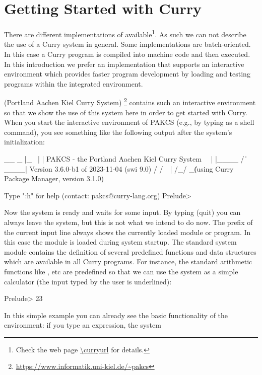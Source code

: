 \chapter{Getting Started with Curry}

There are different implementations of \curryref{}
available\footnote{Check the web page \url{\curryurl} for details.}.
As such we can not describe the use of a Curry system
in general. Some implementations are batch-oriented.  In this case a 
Curry program is compiled into machine code and then executed. 
In this introduction we prefer an implementation that supports an interactive environment which provides faster program development by loading and testing programs within the integrated environment.

\pakcs{} (Portland Aachen Kiel Curry System)
\cite{AntoyHanus00FROCOS,Hanus23PAKCS}\footnote{\url{https://www.informatik.uni-kiel.de/~pakcs}}
contains such an interactive environment so that we show the use
of this system here in order to get started with Curry.
When you start the interactive environment of PAKCS
(e.g., by typing 
as a shell command),
you see something like the following output after the system's
initialization:
%
\begin{curry}
 __    _
|_ \  | |            PAKCS - the Portland Aachen Kiel Curry System
  \ \ | |____
  /  \|  ____|       Version 3.6.0-b1 of 2023-11-04 (swi 9.0)
 / /\ \ |
/_/  \_\|            (using Curry Package Manager, version 3.1.0)

Type ":h" for help (contact: pakcs@curry-lang.org)
Prelude> 
\end{curry}
%
Now the system is ready and waits for some input.
By typing  (quit) you can always leave the system,
but this is not what we intend to do now.
The prefix of the current input line always shows the currently
loaded module or program. In this case the module
is loaded during system startup.
The standard system module  contains
the definition of several predefined functions and data structures
which are available in all Curry programs.
For instance, the standard arithmetic functions like \code{+}, \code{*} etc
are predefined so that we can use the system as a simple calculator
(the input typed by the user is underlined):
\begin{prog}
Prelude> 
23
\end{prog}
In this simple example you can already see the basic functionality
of the environment: if you type an expression, the system
